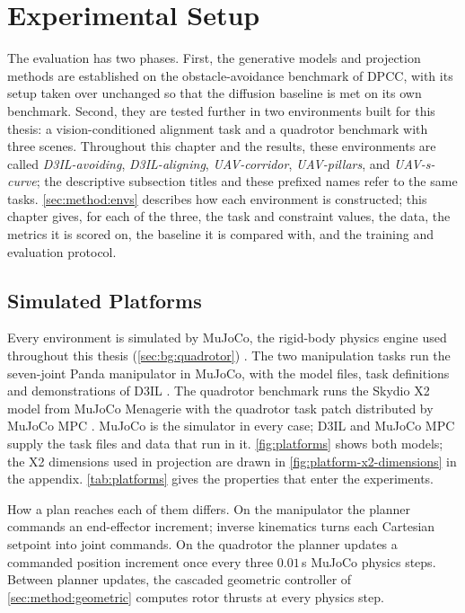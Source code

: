 \chapter{Experimental Setup}\label{ch:setup}

The evaluation has two phases. First, the generative models and projection methods are established on
the obstacle-avoidance benchmark of \ac{DPCC}, with its setup taken over unchanged so that the diffusion
baseline is met on its own benchmark. Second, they are tested further in two environments built for
this thesis: a vision-conditioned alignment task and a quadrotor benchmark with three scenes.
Throughout this chapter and the results, these environments are called \emph{D3IL-avoiding},
\emph{D3IL-aligning}, \emph{UAV-corridor}, \emph{UAV-pillars}, and \emph{UAV-s-curve}; the descriptive
subsection titles and these prefixed names refer to the same tasks. \autoref{sec:method:envs} describes how each environment is constructed; this
chapter gives, for each of the three, the task and constraint values, the data, the metrics it is scored
on, the baseline it is compared with, and the training and evaluation protocol.

\section{Simulated Platforms}\label{sec:setup:platforms}

Every environment is simulated by MuJoCo, the rigid-body physics engine used throughout this thesis
(\autoref{sec:bg:quadrotor}) \parencite{todorov2012mujoco}. The two
manipulation tasks run the seven-joint Panda manipulator in MuJoCo, with the model files, task
definitions and demonstrations of D3IL \parencite{jia2024towards}. The quadrotor benchmark runs the Skydio X2 model from MuJoCo Menagerie
\parencite{zakka2022menagerie} with the quadrotor task patch distributed by MuJoCo MPC
\parencite{howell2022predictive}. MuJoCo is the simulator in every case; D3IL and MuJoCo MPC supply the
task files and data that run in it. \autoref{fig:platforms} shows both models; the X2 dimensions used
in projection are drawn in \autoref{fig:platform-x2-dimensions} in the appendix.
\autoref{tab:platforms} gives the properties that enter the experiments.

How a plan reaches each of them differs. On the manipulator the planner commands an end-effector
increment; inverse kinematics turns each Cartesian setpoint into joint commands. On the quadrotor the
planner updates a commanded position increment once every three $0.01$\,s MuJoCo physics steps.
Between planner updates, the cascaded geometric controller of \autoref{sec:method:geometric}
computes rotor thrusts at every physics step.

